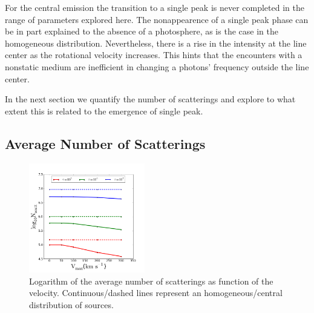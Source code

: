 \documentclass[usenatbib]{mn2e}
\begin{document}
For the central emission the transition to a single peak is never
completed in the range of parameters explored here. The nonappearence
of a single peak phase can be in part explained to the absence of a
photosphere, as is the case in the homogeneous
distribution. Nevertheless, there is a rise in the intensity at the
line center as the rotational velocity increases. This hints that the
encounters with a nonstatic medium are inefficient in changing a
photons' frequency outside the line center.

In the next section we quantify the number of scatterings and explore
to what extent this is related to the emergence of single peak. 

\subsection{Average Number of Scatterings}


\begin{figure}
    \includegraphics[width=0.45\textwidth]{NscattvsVmax.png}
\caption{Logarithm of the average number of scatterings as function of
  the velocity. Continuous/dashed lines represent an
  homogeneous/central distribution of sources. \label{fig:Nscatt}}    
\end{figure}
\end{document}

